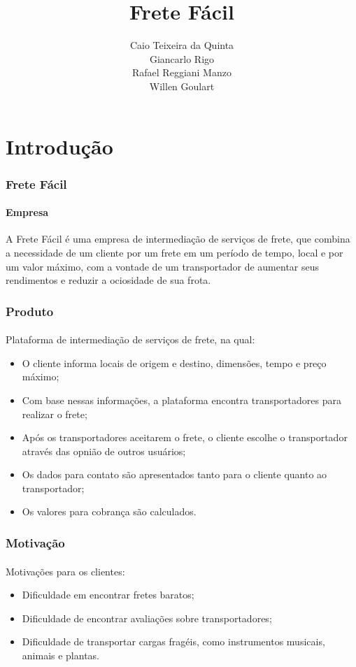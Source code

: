 \documentclass{beamer}
\title{Frete Fácil}
\author{Caio Teixeira da Quinta\\
        Giancarlo Rigo\\
        Rafael Reggiani Manzo\\
        Willen Goulart}
\begin{document}
\maketitle

\section{Introdução}
\begin{frame}
  \frametitle{Frete Fácil}
  \framesubtitle{Empresa}

  A Frete Fácil é uma empresa de intermediação de serviços de frete, que combina a necessidade de um cliente por um frete em um período de tempo, local e por um valor máximo, com a vontade de um transportador de aumentar seus rendimentos e reduzir a ociosidade de sua frota.  
\end{frame}

\begin{frame}
  \frametitle{Produto}
  \framesubtitle{}

  Plataforma de intermediação de serviços de frete, na qual:
    \begin{itemize}
    \item O cliente informa locais de origem e destino, dimensões, tempo e preço máximo;
    \item Com base nessas informações, a plataforma encontra transportadores para realizar o frete;
    \item Após os transportadores aceitarem o frete, o cliente escolhe o transportador através das opnião de outros usuários;
    \item Os dados para contato são apresentados tanto para o cliente quanto ao transportador;
    \item Os valores para cobrança são calculados.
    \end{itemize}
\end{frame}

\begin{frame}
  \frametitle{Motivação}
  \framesubtitle{}
  
  Motivações para os clientes:
    \begin{itemize}
    \item Dificuldade em encontrar fretes baratos;
    \item Dificuldade de encontrar avaliações sobre transportadores;
    \item Dificuldade de transportar cargas fragéis, como instrumentos musicais, animais e plantas.
    \end{itemize}
\end{frame}
\end{document}
